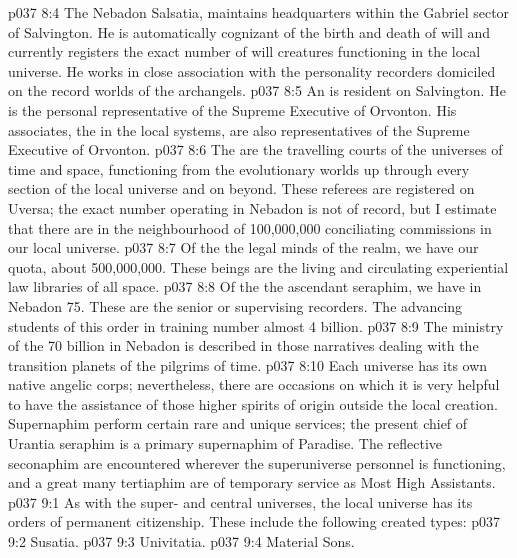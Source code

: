 \vs p037 8:4 The Nebadon  Salsatia, maintains headquarters within the Gabriel sector of Salvington. He is automatically cognizant of the birth and death of will and currently registers the exact number of will creatures functioning in the local universe. He works in close association with the personality recorders domiciled on the record worlds of the archangels.
\vs p037 8:5 An  is resident on Salvington. He is the personal representative of the Supreme Executive of Orvonton. His associates, the  in the local systems, are also representatives of the Supreme Executive of Orvonton.
\vs p037 8:6 The  are the travelling courts of the universes of time and space, functioning from the evolutionary worlds up through every section of the local universe and on beyond. These referees are registered on Uversa; the exact number operating in Nebadon is not of record, but I estimate that there are in the neighbourhood of 100,000,000 conciliating commissions in our local universe.
\vs p037 8:7 Of the  the legal minds of the realm, we have our quota, about 500,000,000. These beings are the living and circulating experiential law libraries of all space.
\vs p037 8:8 Of the  the ascendant seraphim, we have in Nebadon 75. These are the senior or supervising recorders. The advancing students of this order in training number almost 4 billion.
\vs p037 8:9 The ministry of the 70 billion  in Nebadon is described in those narratives dealing with the transition planets of the pilgrims of time.
\vs p037 8:10 \pc Each universe has its own native angelic corps; nevertheless, there are occasions on which it is very helpful to have the assistance of those higher spirits of origin outside the local creation. Supernaphim perform certain rare and unique services; the present chief of Urantia seraphim is a primary supernaphim of Paradise. The reflective seconaphim are encountered wherever the superuniverse personnel is functioning, and a great many tertiaphim are of temporary service as Most High Assistants.
\vs p037 9:1 As with the super\hyp{} and central universes, the local universe has its orders of permanent citizenship. These include the following created types:
\vs p037 9:2 \bibnobreakspace Susatia.
\vs p037 9:3 \bibnobreakspace Univitatia.
\vs p037 9:4 \bibnobreakspace Material Sons.
